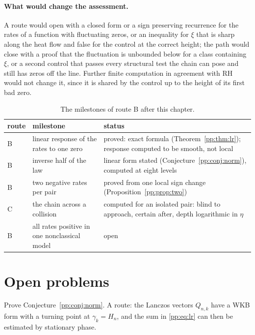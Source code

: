\paragraph{What would change the assessment.} A route would open with a closed form or a sign preserving recurrence for the rates of a function with fluctuating zeros, or an inequality for $\xi$ that is sharp along the heat flow and false for the control at the correct height; the path would close with a proof that the fluctuation is unbounded below for a class containing $\xi$, or a second control that passes every structural test the chain can pose and still has zeros off the line. Further finite computation in agreement with RH would not change it, since it is shared by the control up to the height of its first bad zero.

\begin{table}[ht]
\centering\small
\caption{The milestones of route B after this chapter.}\label{pp:tab:status}
\begin{tabular}{@{}p{}p{}p{}@{}}
\toprule
route & milestone & status\\
\midrule
B & linear response of the rates to one zero & proved: exact formula (Theorem~\ref{pp:thm:lr}); response computed to be smooth, not local\\[2pt]
B & inverse half of the law & linear form stated (Conjecture~\ref{pp:conj:norm}), computed at eight levels\\[2pt]
B & two negative rates per pair & proved from one local sign change (Proposition~\ref{pp:prop:two})\\[2pt]
C & the chain across a collision & computed for an isolated pair: blind to approach, certain after, depth logarithmic in $\eta$\\[2pt]
B & all rates positive in one nonclassical model & open\\
\bottomrule
\end{tabular}
\end{table}

\section{Open problems}\label{pp:sec:open}

\begin{openproblem}
Prove Conjecture~\ref{pp:conj:norm}. A route: the Lanczos vectors $Q_{n,k}$ have a WKB form with a turning point at $\gamma_k=H_n$, and the sum in \eqref{pp:eq:lr} can then be estimated by stationary phase.
\end{openproblem}

